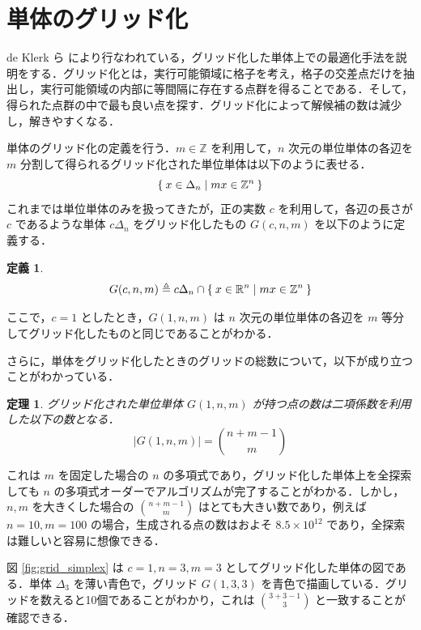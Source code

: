 \documentclass[a4paper,11pt]{jreport}
\newtheorem{definition}{定義}
\newtheorem{theorem}{定理}
\begin{document}
\section{単体のグリッド化}

de Klerk ら \cite{deklerk} により行なわれている，グリッド化した単体上での最適化手法を説明をする．グリッド化とは，実行可能領域に格子を考え，格子の交差点だけを抽出し，実行可能領域の内部に等間隔に存在する点群を得ることである．そして，得られた点群の中で最も良い点を探す．グリッド化によって解候補の数は減少し，解きやすくなる．\par
単体のグリッド化の定義を行う．$ m \in \mathbb{Z} $ を利用して，$ n $ 次元の単位単体の各辺を $ m $ 分割して得られるグリッド化された単位単体は以下のように表せる．
$$ \Set{ x \in \Delta_n | mx \in \mathbb{Z}^n } $$
これまでは単位単体のみを扱ってきたが，正の実数 $ c $ を利用して，各辺の長さが $ c $ であるような単体 $ c \Delta_n $ をグリッド化したもの $ G(c, n, m) $ を以下のように定義する．

\begin{definition}
$$ G(c, n, m) \triangleq c \Delta_n \cap \Set{x \in \mathbb{R}^n | mx \in \mathbb{Z}^n} $$
\end{definition}

ここで，$ c = 1 $ としたとき，$ G(1, n, m) $ は $ n $ 次元の単位単体の各辺を $ m $ 等分してグリッド化したものと同じであることがわかる．\par
さらに，単体をグリッド化したときのグリッドの総数について，以下が成り立つことがわかっている．

\begin{theorem} \label{thm:n_grid}
グリッド化された単位単体 $ G(1, n, m) $ が持つ点の数は二項係数を利用した以下の数となる．
$$ | G(1, n, m) | = \binom{n + m - 1}{m} $$
\end{theorem}

これは $ m $ を固定した場合の $ n $ の多項式であり，グリッド化した単体上を全探索しても $ n $ の多項式オーダーでアルゴリズムが完了することがわかる．しかし，$ n, m $ を大きくした場合の $ \binom{n + m - 1}{m} $ はとても大きい数であり，例えば $ n = 10, m = 100 $ の場合，生成される点の数はおよそ $ 8.5 \times 10^{12} $ であり，全探索は難しいと容易に想像できる．\par
図 \ref{fig:grid_simplex} は $ c=1, n=3, m=3 $ としてグリッド化した単体の図である．単体 $ \Delta_3 $ を薄い青色で，グリッド $ G(1, 3, 3) $ を青色で描画している．グリッドを数えると10個であることがわかり，これは $ \binom{3 + 3 - 1}{3} $ と一致することが確認できる．\par
\end{document}
